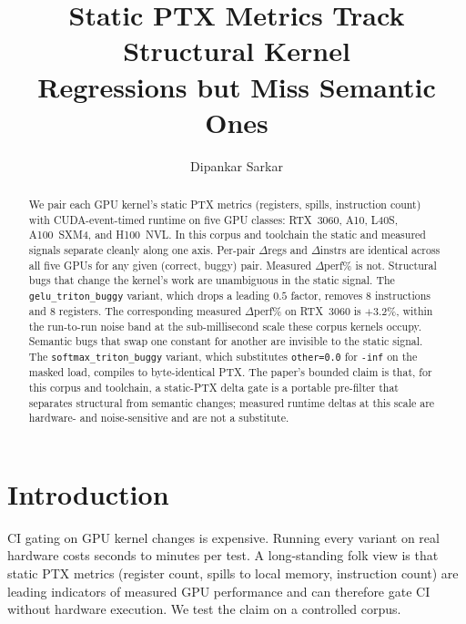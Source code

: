 \documentclass[runningheads]{llncs}
\begin{document}
\title{Static PTX Metrics Track Structural Kernel\\Regressions but Miss Semantic Ones}

\author{Dipankar Sarkar}

\maketitle

\begin{abstract}
We pair each GPU kernel's static PTX metrics (registers, spills,
instruction count) with CUDA-event-timed runtime on five GPU classes:
RTX~3060, A10, L40S, A100~SXM4, and H100~NVL. In this corpus and
toolchain the static and measured signals separate cleanly along one
axis. Per-pair $\Delta$regs and $\Delta$instrs are identical across
all five GPUs for any given (correct, buggy) pair. Measured
$\Delta$perf\% is not. Structural bugs that change the kernel's work
are unambiguous in the static signal. The
\texttt{gelu\_triton\_buggy} variant, which drops a leading $0.5$
factor, removes 8 instructions and 8 registers. The corresponding
measured $\Delta$perf\% on RTX~3060 is $+3.2\%$, within the
run-to-run noise band at the sub-millisecond scale these corpus
kernels occupy. Semantic bugs that swap one constant for another are
invisible to the static signal. The \texttt{softmax\_triton\_buggy}
variant, which substitutes \texttt{other=0.0} for \texttt{-inf} on
the masked load, compiles to byte-identical PTX. The paper's bounded
claim is that, for this corpus and toolchain, a static-PTX delta
gate is a portable pre-filter that separates structural from
semantic changes; measured runtime deltas at this scale are
hardware- and noise-sensitive and are not a substitute.
\end{abstract}

\section{Introduction}
\label{sec:intro}

CI gating on GPU kernel changes is expensive. Running every variant
on real hardware costs seconds to minutes per test. A long-standing
folk view is that static PTX metrics (register count, spills to local
memory, instruction count) are leading indicators of measured GPU
performance and can therefore gate CI without hardware execution. We
test the claim on a controlled corpus.
\end{document}
